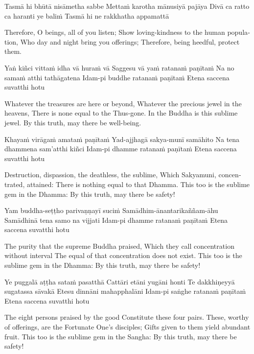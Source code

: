 Tasmā hi bhūtā nisāmetha sabbe
Mettaṁ karotha mānusiyā pajāya
Divā ca ratto ca haranti ye baliṁ
Tasmā hi ne rakkhatha appamattā

\begin{english}
  Therefore, O beings, all of you listen;
  Show loving-kindness to the human population,
  Who day and night bring you offerings;
  Therefore, being heedful, protect them.
\end{english}

Yaṅ kiñci vittaṁ idha vā huraṁ vā
Saggesu vā yaṁ ratanaṁ paṇītaṁ
Na no samaṁ atthi tathāgatena
Idam-pi buddhe ratanaṁ paṇītaṁ
Etena saccena suvatthi hotu

\begin{english}
  Whatever the treasures are here or beyond,
  Whatever the precious jewel in the heavens,
  There is none equal to the Thus-gone.
  In the Buddha is this sublime jewel.
  By this truth, may there be well-being.
\end{english}

Khayaṁ virāgaṁ amataṁ paṇītaṁ
Yad-ajjhagā sakya-munī samāhito
Na tena dhammena sam’atthi kiñci
Idam-pi dhamme ratanaṁ paṇītaṁ
Etena saccena suvatthi hotu

\begin{english}
  Destruction, dispassion, the deathless, the sublime,
  Which Sakyamuni, concentrated, attained:
  There is nothing equal to that Dhamma.
  This too is the sublime gem in the Dhamma:
  By this truth, may there be safety!
\end{english}

Yam buddha-seṭṭho parivaṇṇayī suciṁ
Samādhim-ānantarikaññam-āhu
Samādhinā tena samo na vijjati
Idam-pi dhamme ratanaṁ paṇītaṁ
Etena saccena suvatthi hotu

\begin{english}
  The purity that the supreme Buddha praised,
  Which they call concentration without interval
  The equal of that concentration does not exist.
  This too is the sublime gem in the Dhamma:
  By this truth, may there be safety!
\end{english}

Ye puggalā aṭṭha sataṁ pasatthā
Cattāri etāni yugāni honti
Te dakkhiṇeyyā sugatassa sāvakā
Etesu dinnāni mahapphalāni
Idam-pi saṅghe ratanaṁ paṇītaṁ
Etena saccena suvatthi hotu

\begin{english}
  The eight persons praised by the good
  Constitute these four pairs.
  These, worthy of offerings, are the Fortunate One’s disciples;
  Gifts given to them yield abundant fruit.
  This too is the sublime gem in the Sangha:
  By this truth, may there be safety!
\end{english}

